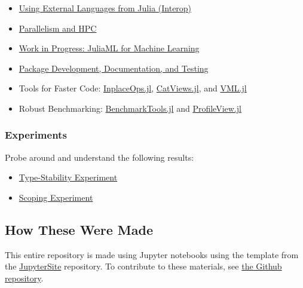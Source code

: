 \documentclass[11pt]{article}
\begin{document}
\begin{itemize}
\itemsep1pt\parskip0pt
\item
  \href{http://ucidatascienceinitiative.github.io/IntroToJulia/Slides/Interop}{Using
  External Languages from Julia (Interop)}
\item
  \href{http://ucidatascienceinitiative.github.io/IntroToJulia/Slides/HPCJulia}{Parallelism
  and HPC}
\item
  \href{http://ucidatascienceinitiative.github.io/IntroToJulia/Slides/JuliaML}{Work
  in Progress: JuliaML for Machine Learning}
\item
  \href{http://ucidatascienceinitiative.github.io/IntroToJulia/Slides/PackageDevelopment}{Package
  Development, Documentation, and Testing}
\item
  Tools for Faster Code:
  \href{https://github.com/simonbyrne/InplaceOps.jl}{InplaceOps.jl},
  \href{https://github.com/ahwillia/CatViews.jl}{CatViews.jl}, and
  \href{https://github.com/JuliaMath/VML.jl}{VML.jl}
\item
  Robust Benchmarking:
  \href{https://github.com/JuliaCI/BenchmarkTools.jl}{BenchmarkTools.jl}
  and \href{https://github.com/timholy/ProfileView.jl}{ProfileView.jl}
\end{itemize}

\subsubsection{Experiments}\label{experiments}

Probe around and understand the following results:

\begin{itemize}
\itemsep1pt\parskip0pt
\item
  \href{http://ucidatascienceinitiative.github.io/IntroToJulia/Slides/TypeStabilityExperiment}{Type-Stability
  Experiment}
\item
  \href{http://ucidatascienceinitiative.github.io/IntroToJulia/Slides/ScopingExperiment}{Scoping
  Experiment}
\end{itemize}

    \subsection{How These Were Made}\label{how-these-were-made}

This entire repository is made using Jupyter notebooks using the
template from the
\href{https://github.com/ChrisRackauckas/JupyterSite}{JupyterSite}
repository. To contribute to these materials, see
\href{https://github.com/UCIDataScienceInitiative/IntroToJulia}{the
Github repository}.


    
    
    
    
\end{document}
